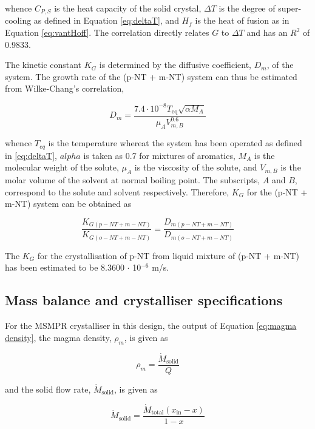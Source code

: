\noindent whence $C_{P,S}$ is the heat capacity of the solid crystal, $\Delta T$ is the degree of super-cooling as defined in Equation \ref{eq:deltaT}, and $H_{f}$ is the heat of fusion as in Equation \ref{eq:vantHoff}. The correlation directly relates $G$ to $\Delta T$ and has an $R^2$ of 0.9833.

The kinetic constant $K_G$ is determined by the diffusive coefficient, $D_m$, of the system. The growth rate of the (p-NT + m-NT) system can thus be estimated from Wilke-Chang's correlation, \cite{Miyabe}

\begin{equation}
    D_m = \frac{7.4 \cdot 10^{-8} T_{\mathrm{eq}} \sqrt{\alpha M_A}}{\mu_A V_{m,B}^0.6}
\end{equation}

\noindent whence $T_{eq}$ is the temperature whereat the system has been operated as defined in \ref{eq:deltaT}, $alpha$ is taken as 0.7 for mixtures of aromatics, $M_A$ is the molecular weight of the solute, $\mu_A$ is the viscosity of the solute, and $V_{m,B}$ is the molar volume of the solvent at normal boiling point. The subscripts, $A$ and $B$, correspond to the solute and solvent respectively. Therefore, $K_G$ for the (p-NT + m-NT) system can be obtained as 

\begin{equation}
    \frac{K_{G(p-NT + m-NT)}}{K_{G(o-NT + m-NT)}} = \frac{D_{m(p-NT + m-NT)}}{D_{m(o-NT + m-NT)}}
\end{equation}

\noindent The $K_G$ for the crystallisation of p-NT from liquid mixture of (p-NT + m-NT) has been estimated to be 8.3600 $\cdot$ 10$^{-6}$ m/s. 

\subsection{Mass balance and crystalliser specifications}

For the MSMPR crystalliser in this design, the output of Equation \ref{eq:magma density}, the magma density, $\rho_m$, is given as 

\begin{equation}
    \rho_m = \frac{\dot{M}_{\mathrm{solid}}}{Q}
\end{equation}

\noindent and the solid flow rate, $\dot{M}_{\mathrm{solid}}$, is given as

\begin{equation}
    \dot{M}_{\mathrm{solid}} = \frac{\dot{M}_{\mathrm{total}} (x_{\mathrm{in}} - x)}{1 - x}
\end{equation}


